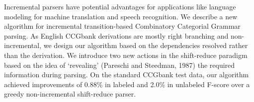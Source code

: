 Incremental parsers have potential advantages for applications like language modeling for machine translation and speech recognition. We describe a new algorithm for incremental transition-based Combinatory Categorial Grammar parsing. As English CCGbank derivations are mostly right branching and non-incremental, we design our algorithm based on the dependencies resolved rather than the derivation. We introduce two new actions in the shift-reduce paradigm based on the idea of ‘revealing' (Pareschi and Steedman, 1987) the required information during parsing. On the standard CCGbank test data, our algorithm achieved improvements of 0.88\% in labeled and 2.0\% in unlabeled F-score over a greedy non-incremental shift-reduce parser.
